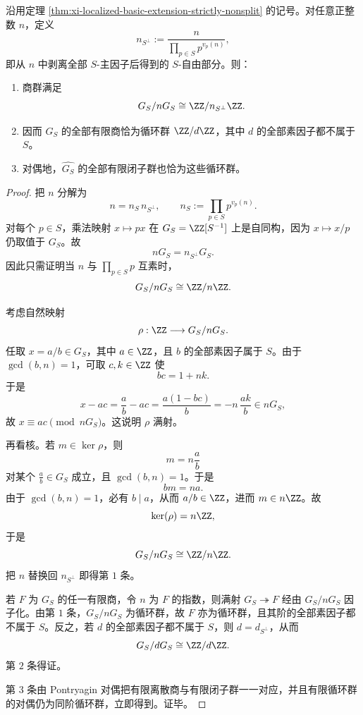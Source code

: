 \begin{theorem}[有限商与有限相位层的完全分类]\label{thm:xi-localized-finite-quotient-phase-layer-classification}
沿用定理 \ref{thm:xi-localized-basic-extension-strictly-nonsplit} 的记号。对任意正整数 \(n\)，定义
\[
n_{S^\perp}:=\frac{n}{\prod_{p\in S}p^{v_p(n)}},
\]
即从 \(n\) 中剥离全部 \(S\)-主因子后得到的 \(S\)-自由部分。则：
\begin{enumerate}
  \item 商群满足
  \[
  G_S/nG_S\cong \ZZ/n_{S^\perp}\ZZ.
  \]
  \item 因而 \(G_S\) 的全部有限商恰为循环群 \(\ZZ/d\ZZ\)，其中 \(d\) 的全部素因子都不属于 \(S\)。
  \item 对偶地，\(\widehat{G_S}\) 的全部有限闭子群也恰为这些循环群。
\end{enumerate}
\end{theorem}
\begin{proof}
把 \(n\) 分解为
\[
n=n_S\,n_{S^\perp},
\qquad
n_S:=\prod_{p\in S}p^{v_p(n)}.
\]
对每个 \(p\in S\)，乘法映射 \(x\mapsto px\) 在 \(G_S=\ZZ[S^{-1}]\) 上是自同构，因为 \(x\mapsto x/p\) 仍取值于 \(G_S\)。故
\[
nG_S=n_{S^\perp}G_S.
\]
因此只需证明当 \(n\) 与 \(\prod_{p\in S}p\) 互素时，
\[
G_S/nG_S\cong \ZZ/n\ZZ.
\]

考虑自然映射
\[
\rho:\ZZ\longrightarrow G_S/nG_S.
\]
任取 \(x=a/b\in G_S\)，其中 \(a\in\ZZ\)，且 \(b\) 的全部素因子属于 \(S\)。由于 \(\gcd(b,n)=1\)，可取 \(c,k\in\ZZ\) 使
\[
bc=1+nk.
\]
于是
\[
x-ac
=
\frac{a}{b}-ac
=
\frac{a(1-bc)}{b}
=
-n\,\frac{ak}{b}\in nG_S,
\]
故 \(x\equiv ac\pmod{nG_S}\)。这说明 \(\rho\) 满射。

再看核。若 \(m\in\ker\rho\)，则
\[
m=n\frac{a}{b}
\]
对某个 \(\frac{a}{b}\in G_S\) 成立，且 \(\gcd(b,n)=1\)。于是
\[
bm=na.
\]
由于 \(\gcd(b,n)=1\)，必有 \(b\mid a\)，从而 \(a/b\in \ZZ\)，进而 \(m\in n\ZZ\)。故
\[
\ker(\rho)=n\ZZ,
\]
于是
\[
G_S/nG_S\cong \ZZ/n\ZZ.
\]
把 \(n\) 替换回 \(n_{S^\perp}\) 即得第 \(1\) 条。

若 \(F\) 为 \(G_S\) 的任一有限商，令 \(n\) 为 \(F\) 的指数，则满射 \(G_S\twoheadrightarrow F\) 经由 \(G_S/nG_S\) 因子化。由第 \(1\) 条，\(G_S/nG_S\) 为循环群，故 \(F\) 亦为循环群，且其阶的全部素因子都不属于 \(S\)。反之，若 \(d\) 的全部素因子都不属于 \(S\)，则 \(d=d_{S^\perp}\)，从而
\[
G_S/dG_S\cong \ZZ/d\ZZ.
\]
第 \(2\) 条得证。

第 \(3\) 条由 Pontryagin 对偶把有限离散商与有限闭子群一一对应，并且有限循环群的对偶仍为同阶循环群，立即得到。证毕。
\end{proof}



